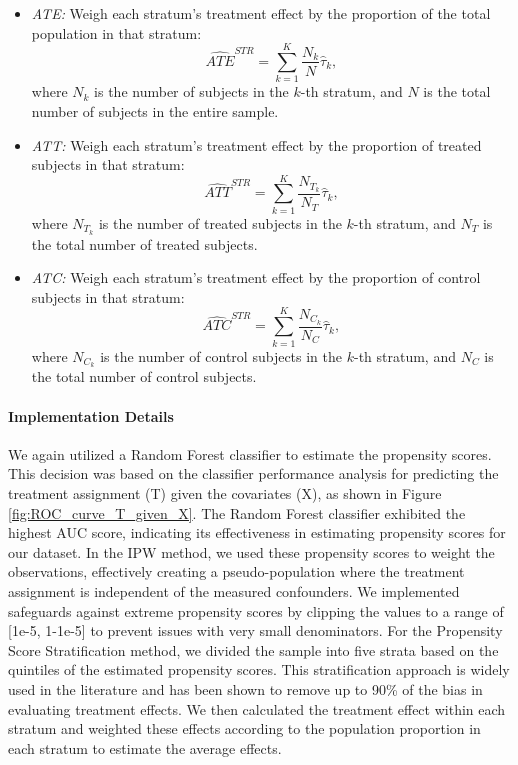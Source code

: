 \documentclass{article}
\begin{document}
\begin{itemize}
    \item \textit{ATE:} Weigh each stratum's treatment effect by the proportion of the total population in that stratum:
    \[
    \widehat{ATE}^{STR} = \sum_{k=1}^{K} \frac{N_k}{N} \hat{\tau}_k,
    \]
    where $ N_k $ is the number of subjects in the $ k $-th stratum, and $ N $ is the total number of subjects in the entire sample. 

    \item \textit{ATT:} Weigh each stratum’s treatment effect by the proportion of treated subjects in that stratum:
    \[
    \widehat{ATT}^{STR} = \sum_{k=1}^{K} \frac{N_{T_k}}{N_T} \hat{\tau}_k,
    \]
    where $ N_{T_k} $ is the number of treated subjects in the $ k $-th stratum, and $ N_T $ is the total number of treated subjects.

    \item \textit{ATC:} Weigh each stratum's treatment effect by the proportion of control subjects in that stratum:
    \[
    \widehat{ATC}^{STR} = \sum_{k=1}^{K} \frac{N_{C_k}}{N_C} \hat{\tau}_k,
    \]
    where $ N_{C_k} $ is the number of control subjects in the $ k $-th stratum, and $ N_C $ is the total number of control subjects.
\end{itemize}


\paragraph{Implementation Details} We again utilized a Random Forest classifier to estimate the propensity scores. This decision was based on the classifier performance analysis for predicting the treatment assignment (T) given the covariates (X), as shown in Figure \ref{fig:ROC_curve_T_given_X}. The Random Forest classifier exhibited the highest AUC score, indicating its effectiveness in estimating propensity scores for our dataset.
In the IPW method, we used these propensity scores to weight the observations, effectively creating a pseudo-population where the treatment assignment is independent of the measured confounders. We implemented safeguards against extreme propensity scores by clipping the values to a range of [1e-5, 1-1e-5] to prevent issues with very small denominators.
For the Propensity Score Stratification method, we divided the sample into five strata based on the quintiles of the estimated propensity scores. This stratification approach is widely used in the literature and has been shown to remove up to 90\% of the bias in evaluating treatment effects. We then calculated the treatment effect within each stratum and weighted these effects according to the population proportion in each stratum to estimate the average effects.
\end{document}
